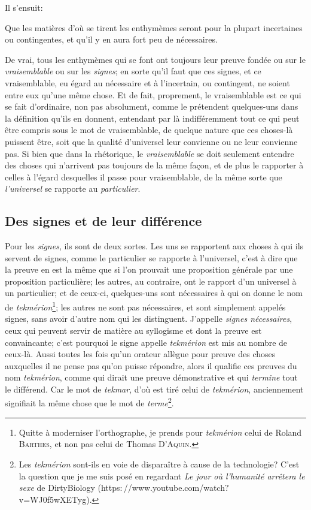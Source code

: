 Il s'ensuit:

\begin{emphpar}
	Que les matières d'où se tirent les enthymèmes seront pour la plupart incertaines ou contingentes, et qu'il y en aura fort peu de nécessaires.
\end{emphpar}

De vrai, tous les enthymèmes qui se font ont toujours leur preuve fondée ou sur le \emph{vraisemblable} ou sur les \emph{signes}; en sorte qu'il faut que
ces signes, et ce vraisemblable, eu égard au nécessaire et à l'incertain, ou contingent, ne soient entre eux qu'une même chose. Et de fait, proprement,
le vraisemblable est ce qui se fait d'ordinaire, non %
pas absolument, comme le prétendent quelques-uns dans la définition qu'ils en donnent, entendant par là indifféremment tout ce qui peut être compris sous
le mot de vraisemblable, de quelque nature que ces choses-là puissent être, soit que la qualité d'universel leur convienne ou ne leur convienne pas. Si
bien que dans la rhétorique, le \emph{vraisemblable} se doit seulement entendre des choses qui n'arrivent pas toujours de la même façon, et de plus le rapporter
à celles à l'égard desquelles il passe pour vraisemblable, de la même sorte que \emph{l'universel} se rapporte au \emph{particulier}.

\subsection{Des signes et de leur différence}

Pour les \emph{signes}, ils sont de deux sortes. Les uns se rapportent aux choses à qui ils servent de signes, comme le particulier se rapporte à l'universel,
c'est à dire que la preuve en est la même que si l'on prouvait une proposition générale par une proposition particulière; les autres, au contraire, ont
le rapport d'un universel à un particulier; et de ceux-ci, quelques-uns sont nécessaires à qui on donne le nom de \emph{tekmérion}\footnote{Quitte à moderniser
l'orthographe, je prends pour \emph{tekmérion} celui de Roland \textsc{Barthes}, et non pas celui de Thomas \textsc{D'Aquin}.}; les autres ne sont
pas nécessaires, et sont simplement appelés signes, sans avoir d'autre nom qui les distinguent. J'appelle \emph{signes nécessaires}, ceux qui peuvent
servir de matière au syllogisme et dont la preuve est convaincante; c'est pourquoi le signe appelle \emph{tekmérion} est mis au nombre de ceux-là. Aussi
toutes les fois qu'un orateur allègue pour preuve des choses auxquelles il ne pense pas qu'on puisse répondre, alors il qualifie ces preuves du nom
\emph{tekmérion}, comme qui dirait une preuve démonstrative et qui \emph{termine} tout le différend. Car le mot de \emph{tekmar}, d'où est tiré celui de
\emph{tekmérion}, anciennement signifiait la même chose que le mot de \emph{terme}\footnote{Les \emph{tekmérion} sont-ils en voie de disparaître à cause
de la technologie? C'est la question que je me suis posé en regardant \emph{Le jour où l'humanité arrêtera le sexe} de DirtyBiology
(https${:}$//www.youtube.com/watch${?}$v=WJ0f5wXETyg).}.

